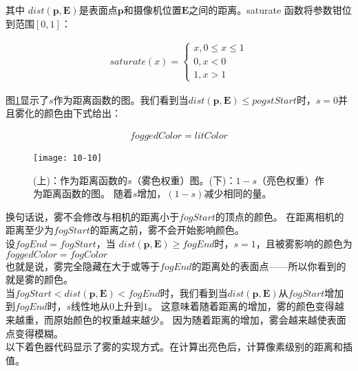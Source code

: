 \begin{flushleft}
其中 $dist(\boldsymbol{p},\boldsymbol{E})$是表面点$\boldsymbol{p}$和摄像机位置$\boldsymbol{E}$之间的距离。saturate 函数将参数钳位到范围$[0,1]$：\\
\end{flushleft}

\begin{align*}
saturate(x)=\left\{\begin{matrix}
x,0\leq x\leq 1\\ 
0,x<0\\ 
1,x>1
\end{matrix}\right.
\end{align*}

\begin{flushleft}
图\ref{fig:10-10}显示了$s$作为距离函数的图。我们看到当$dist(\boldsymbol{p},\boldsymbol{E})\leq pogstStart$时，$s=0$并且雾化的颜色由下式给出：\\
\end{flushleft}

\begin{align*}
foggedColor=litColor
\end{align*}

\begin{figure}[h]
    \texttt{[image: 10-10]}
    \centering
    \caption{(上)：作为距离函数的$s$（雾色权重）图。(下)：$1-s$（亮色权重）作为距离函数的图。 随着$s$增加，$(1-s)$减少相同的量。}
    \label{fig:10-10}
\end{figure}

\begin{flushleft}
换句话说，雾不会修改与相机的距离小于$fogStart$的顶点的颜色。 在距离相机的距离至少为$fogStart$的距离之前，雾不会开始影响颜色。\\

设$fogEnd=fogStart$，当 $dist(\boldsymbol{p},\boldsymbol{E})\geq fogEnd$时，$s=1$，且被雾影响的颜色为 $foggedColor=fogColor$\\

也就是说，雾完全隐藏在大于或等于$fogEnd$的距离处的表面点——所以你看到的就是雾的颜色。\\

当$fogStart<dist(\boldsymbol{p},\boldsymbol{E})<fogEnd$时，我们看到当$dist(\boldsymbol{p},\boldsymbol{E})$从$fogStart$增加到$fogEnd$时，$s$线性地从$0$上升到$1$。 这意味着随着距离的增加，雾的颜色变得越来越重，而原始颜色的权重越来越少。 因为随着距离的增加，雾会越来越使表面点变得模糊。\\

以下着色器代码显示了雾的实现方式。在计算出亮色后，计算像素级别的距离和插值。\\
\end{flushleft}

